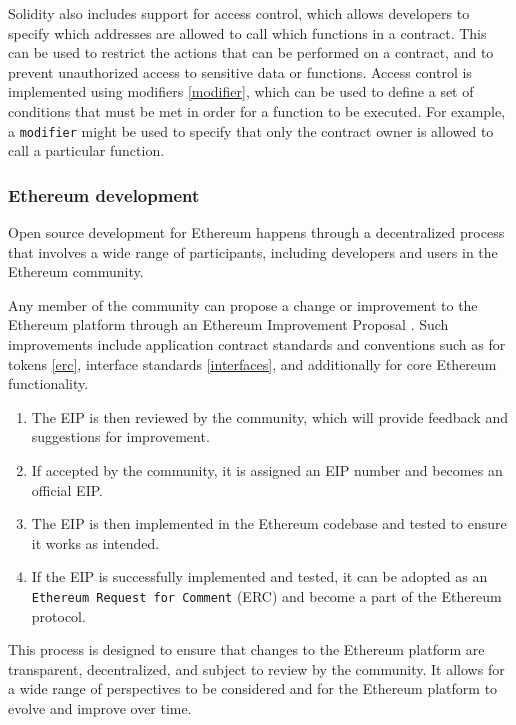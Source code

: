 \documentclass{article}
\theoremstyle{theorem}
\theoremstyle{definition}
\theoremstyle{remark}
\begin{document}
Solidity also includes support for access control, which allows developers to specify which addresses are allowed to call which functions in a contract. This can be used to restrict the actions that can be performed on a contract, and to prevent unauthorized access to sensitive data or functions. Access control is implemented using \colorbox{Gainsboro!60!Lavender}{modifiers} \ref{modifier}, which can be used to define a set of conditions that must be met in order for a function to be executed. For example, a \texttt{modifier} might be used to specify that only the contract owner is allowed to call a particular function.

\subsubsection{Ethereum  development } \label{development}

Open source development for Ethereum happens through a decentralized process that involves a wide range of participants, including developers and users in the Ethereum community. 

\medskip\noindent
Any member of the community can propose a change or improvement to the Ethereum platform through an \colorbox{Gainsboro!60!Lavender}{Ethereum Improvement Proposal} \cite{eip}. Such improvements include application contract standards and conventions such as for tokens \ref{erc}, interface standards \ref{interfaces}, and additionally for core Ethereum functionality.

\begin{enumerate}
    \item The EIP is then reviewed by the community, which will provide feedback and suggestions for improvement.
    \item If accepted by the community, it is assigned an EIP number and becomes an official EIP.
    \item The EIP is then implemented in the Ethereum codebase and tested to ensure it works as intended.
    \item If the EIP is successfully implemented and tested, it can be adopted as an \texttt{Ethereum Request for Comment} (ERC) and become a part of the Ethereum protocol.
\end{enumerate}

\medskip\noindent
This process is designed to ensure that changes to the Ethereum platform are transparent, decentralized, and subject to review by the community. It allows for a wide range of perspectives to be considered and for the Ethereum platform to evolve and improve over time. 
\end{document}
